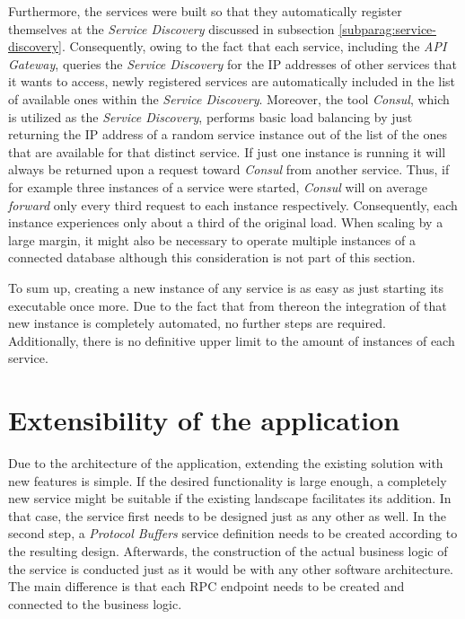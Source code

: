 \documentclass[12pt,a4paper,twoside]{report}
\begin{document}
Furthermore, the services were built so that they automatically register themselves
at the \textit{Service Discovery} discussed in subsection
\ref{subparag:service-discovery}. Consequently, owing to the fact that each
service, including the \textit{API Gateway}, queries the \textit{Service Discovery}
for the IP addresses of other services that it wants to access, newly registered
services are automatically included in the list of available ones within the
\textit{Service Discovery}. Moreover, the tool \textit{Consul}, which is utilized
as the \textit{Service Discovery}, performs basic load balancing by just
returning the IP address of a random service instance out of the list of the
ones that are available for that distinct service.
If just one instance is running it will always be returned upon a request
toward \textit{Consul} from another service. Thus, if for example
three instances of a service were started, \textit{Consul} will on average
\textit{forward} only every third request to each instance respectively.
Consequently, each instance experiences only about a third of the original load.
When scaling by a large margin, it might also be necessary to operate multiple
instances of a connected database although this consideration
is not part of this section.

To sum up, creating a new instance of any service is as easy as just
starting its executable once more. Due to the fact that from thereon the
integration of that new instance is completely automated,
no further steps are required. Additionally, there is no definitive
upper limit to the amount of instances of each service.


\section{Extensibility of the application}

Due to the architecture of the application, extending the existing solution
with new features is simple.
If the desired functionality is large enough, a completely new service might
be suitable if the existing landscape facilitates its addition.
In that case, the service first needs to be designed just as any other as well.
In the second step, a \textit{Protocol Buffers} service definition needs to be
created according to the resulting design.
Afterwards, the construction of the actual business logic of the service is
conducted just as it would be with any other software architecture.
The main difference is that each RPC endpoint needs to be created and connected
to the business logic.
\end{document}
